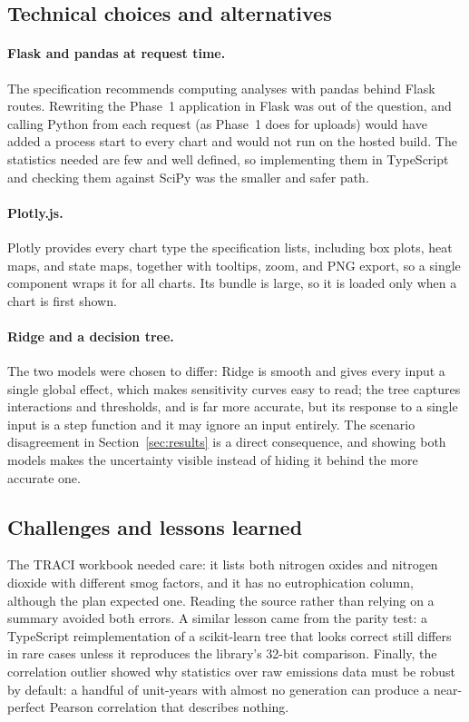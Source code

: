 \documentclass[11pt,a4paper]{article}
\begin{document}
\subsection{Technical choices and alternatives}

\paragraph{Flask and pandas at request time.} The specification recommends computing analyses
with pandas behind Flask routes. Rewriting the Phase~1 application in Flask was out of the
question, and calling Python from each request (as Phase~1 does for uploads) would have added
a process start to every chart and would not run on the hosted build. The statistics needed are
few and well defined, so implementing them in TypeScript and checking them against SciPy was
the smaller and safer path.

\paragraph{Plotly.js.} Plotly provides every chart type the specification lists, including box
plots, heat maps, and state maps, together with tooltips, zoom, and PNG export, so a single
component wraps it for all charts. Its bundle is large, so it is loaded only when a chart is
first shown.

\paragraph{Ridge and a decision tree.} The two models were chosen to differ: Ridge is smooth and
gives every input a single global effect, which makes sensitivity curves easy to read; the tree
captures interactions and thresholds, and is far more accurate, but its response to a single
input is a step function and it may ignore an input entirely. The scenario disagreement in
Section~\ref{sec:results} is a direct consequence, and showing both models makes the
uncertainty visible instead of hiding it behind the more accurate one.

\subsection{Challenges and lessons learned}

The TRACI workbook needed care: it lists both nitrogen oxides and nitrogen dioxide with
different smog factors, and it has no eutrophication column, although the plan expected one.
Reading the source rather than relying on a summary avoided both errors. A similar lesson came
from the parity test: a TypeScript reimplementation of a scikit-learn tree that looks correct
still differs in rare cases unless it reproduces the library's 32-bit comparison. Finally, the
correlation outlier showed why statistics over raw emissions data must be robust by default:
a handful of unit-years with almost no generation can produce a near-perfect Pearson correlation
that describes nothing.
\end{document}
